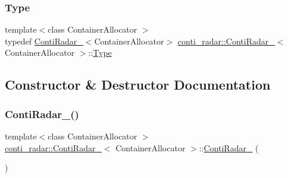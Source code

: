 \subsubsection{\texorpdfstring{Type}{Type}}
{\footnotesize\ttfamily template$<$class Container\+Allocator $>$ \\
typedef \hyperlink{structconti__radar_1_1ContiRadar__}{Conti\+Radar\+\_\+}$<$Container\+Allocator$>$ \hyperlink{structconti__radar_1_1ContiRadar__}{conti\+\_\+radar\+::\+Conti\+Radar\+\_\+}$<$ Container\+Allocator $>$\+::\hyperlink{structconti__radar_1_1ContiRadar___ab750a8aec78c3a090439c7425be8e9fc}{Type}}



\subsection{Constructor \& Destructor Documentation}
\mbox{\label{structconti__radar_1_1ContiRadar___ae54e31aedc9cc2210f32c6f500fa5b3b}} 
\subsubsection{\texorpdfstring{Conti\+Radar\+\_\+()}{ContiRadar\_()}\hspace{0.1cm}{\footnotesize\ttfamily [1/2]}}
{\footnotesize\ttfamily template$<$class Container\+Allocator $>$ \\
\hyperlink{structconti__radar_1_1ContiRadar__}{conti\+\_\+radar\+::\+Conti\+Radar\+\_\+}$<$ Container\+Allocator $>$\+::\hyperlink{structconti__radar_1_1ContiRadar__}{Conti\+Radar\+\_\+} (\begin{DoxyParamCaption}{ }\end{DoxyParamCaption})\hspace{0.3cm}{\ttfamily [inline]}}

\mbox{\label{structconti__radar_1_1ContiRadar___a1e7cafdbc1ee94fd920ddcacc48206c2}} 
